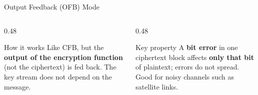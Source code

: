 \documentclass[aspectratio=169,11pt,xcolor={table}]{beamer}
\begin{document}
\begin{frame}{Output Feedback (OFB) Mode}
  \centering
  \vspace{3mm}
  \begin{columns}[T]
    \begin{column}{0.48\textwidth}
      \begin{block}{How it works}
        \small Like CFB, but the \textbf{output of the encryption function} (not the ciphertext) is fed back. The key stream does not depend on the message.
      \end{block}
    \end{column}
    \begin{column}{0.48\textwidth}
      \begin{exampleblock}{Key property}
        \small A \textbf{bit error} in one ciphertext block affects \textbf{only that bit} of plaintext; errors do not spread. Good for noisy channels such as satellite links.
      \end{exampleblock}
    \end{column}
  \end{columns}
\end{frame}
\end{document}
